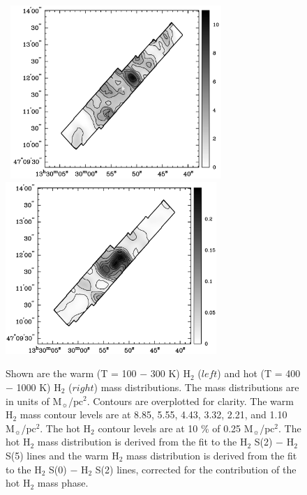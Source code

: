 \documentclass[manuscript]{aastex}
\begin{document}
\clearpage

\begin{figure}[!h]
\centerline{\hbox{\hspace{0.0in}
\includegraphics[width=8cm,angle=0]{bw_warm_h2_mass.jpg}
\hspace{0.1in}
\includegraphics[width=8cm,angle=0]{new_bw_hot_h2_mass.jpg}}}
\caption{Shown are the warm (T = 100 $-$ 300 K) $\mathrm{H_2}$ ($left$) and hot (T = 400 $-$ 1000 K) $\mathrm{H_2}$ ($right$) mass distributions.  The mass distributions are in units of $\mathrm{M_\sun}$/$\mathrm{pc^2}$.   Contours are overplotted for clarity.  The warm $\mathrm{H_2}$ mass contour levels are at 8.85, 5.55, 4.43, 3.32, 2.21, and 1.10 $\mathrm{M_\sun}$/$\mathrm{pc^2}$.  The hot $\mathrm{H_2}$ contour levels are at 10 \% of 0.25 $\mathrm{M_\sun}$/$\mathrm{pc^2}$.  The hot $\mathrm{H_2}$ mass distribution is derived from the fit to the $\mathrm{H_2}$ S(2) $-$ $\mathrm{H_2}$ S(5) lines and the warm $\mathrm{H_2}$ mass distribution is derived from the fit to the $\mathrm{H_2}$ S(0) $-$ $\mathrm{H_2}$ S(2) lines, corrected for the contribution of the hot $\mathrm{H_2}$ mass phase.  \label{fig3}}
\end{figure}

\clearpage
\end{document}
